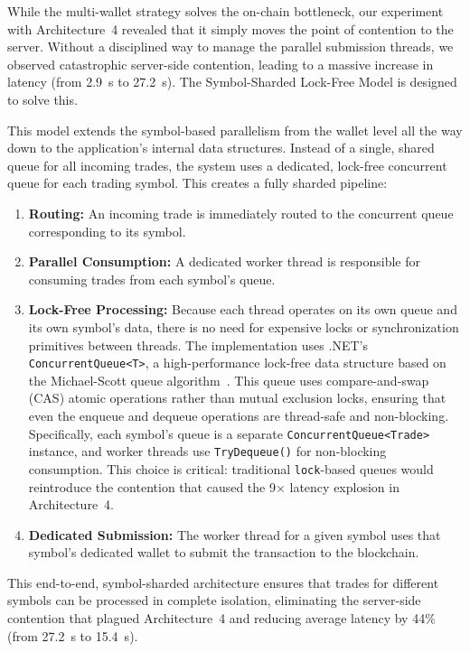 While the multi-wallet strategy solves the on-chain bottleneck, our experiment with Architecture~4 revealed that it simply moves the point of contention to the server. Without a disciplined way to manage the parallel submission threads, we observed catastrophic server-side contention, leading to a massive increase in latency (from 2.9~s to 27.2~s). The Symbol-Sharded Lock-Free Model is designed to solve this.

This model extends the symbol-based parallelism from the wallet level all the way down to the application's internal data structures. Instead of a single, shared queue for all incoming trades, the system uses a dedicated, lock-free concurrent queue for each trading symbol. This creates a fully sharded pipeline:

\begin{enumerate}
    \item \textbf{Routing:} An incoming trade is immediately routed to the concurrent queue corresponding to its symbol.
    \item \textbf{Parallel Consumption:} A dedicated worker thread is responsible for consuming trades from each symbol's queue.
    \item \textbf{Lock-Free Processing:} Because each thread operates on its own queue and its own symbol's data, there is no need for expensive locks or synchronization primitives between threads. The implementation uses .NET's \texttt{ConcurrentQueue<T>}, a high-performance lock-free data structure based on the Michael-Scott queue algorithm~\cite{cederman2013lockfree}. This queue uses compare-and-swap (CAS) atomic operations rather than mutual exclusion locks, ensuring that even the enqueue and dequeue operations are thread-safe and non-blocking. Specifically, each symbol's queue is a separate \texttt{ConcurrentQueue<Trade>} instance, and worker threads use \texttt{TryDequeue()} for non-blocking consumption. This choice is critical: traditional \texttt{lock}-based queues would reintroduce the contention that caused the 9$\times$ latency explosion in Architecture~4.
    \item \textbf{Dedicated Submission:} The worker thread for a given symbol uses that symbol's dedicated wallet to submit the transaction to the blockchain.
\end{enumerate}

This end-to-end, symbol-sharded architecture ensures that trades for different symbols can be processed in complete isolation, eliminating the server-side contention that plagued Architecture~4 and reducing average latency by 44\% (from 27.2~s to 15.4~s).

